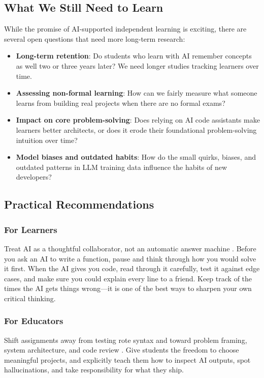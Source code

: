\documentclass[11pt]{article}
\begin{document}
\subsection{What We Still Need to Learn}
While the promise of AI-supported independent learning is exciting, there are several open questions that need more long-term research:
\begin{itemize}
\item \textbf{Long-term retention}: Do students who learn with AI remember concepts as well two or three years later? We need longer studies tracking learners over time.
\item \textbf{Assessing non-formal learning}: How can we fairly measure what someone learns from building real projects when there are no formal exams?
\item \textbf{Impact on core problem-solving}: Does relying on AI code assistants make learners better architects, or does it erode their foundational problem-solving intuition over time?
\item \textbf{Model biases and outdated habits}: How do the small quirks, biases, and outdated patterns in LLM training data influence the habits of new developers?
\end{itemize}

\subsection{Practical Recommendations}

\subsubsection{For Learners}
Treat AI as a thoughtful collaborator, not an automatic answer machine \citep{zimmerman2002}. Before you ask an AI to write a function, pause and think through how you would solve it first. When the AI gives you code, read through it carefully, test it against edge cases, and make sure you could explain every line to a friend. Keep track of the times the AI gets things wrong---it is one of the best ways to sharpen your own critical thinking.

\subsubsection{For Educators}
Shift assignments away from testing rote syntax and toward problem framing, system architecture, and code review \citep{agenticengineer2026}. Give students the freedom to choose meaningful projects, and explicitly teach them how to inspect AI outputs, spot hallucinations, and take responsibility for what they ship.
\end{document}
